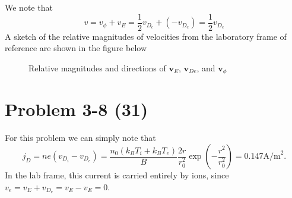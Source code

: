 We note that 
\begin{equation*}
	v = v_\phi + v_E = \frac{1}{2}v_{D_e} + (-v_{D_e}) = \frac{1}{2}v_{D_e}
\end{equation*}
A sketch of the relative magnitudes of velocities from the laboratory frame of reference are shown in the figure below
\begin{figure}[!h]
	\centering
	\caption{Relative magnitudes and directions of \(\bm{v}_E\), \(\bm{v}_{De}\), and \(\bm{v}_\phi\)}
	\label{fig:3-7}
\end{figure}

\section*{Problem 3-8 (31)}
\label{sec:3-8}
For this problem we can simply note that 
\begin{equation*}
	j_D = ne\left(v_{D_i} - v_{D_e}\right) = \dfrac{n_0(k_BT_i + k_BT_e)}{B}\dfrac{2r}{r^2_0}\exp\left(-\dfrac{r^2}{r^2_0} \right) = 0.147 \text{A/m}^2.
\end{equation*}
In the lab frame, this current is carried entirely by ions, since \(v_e = v_E + v_{D_e} = v_E - v_E = 0 \).




